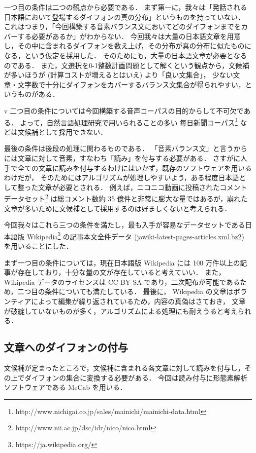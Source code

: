 \documentclass[final,10pt,twocolumn,3p,times,fleqn]{elsarticle}
\begin{document}
  一つ目の条件は二つの観点から必要である．
  まず第一に，我々は「発話される日本語において登場するダイフォンの真の分布」というものを持っていない．
  これはつまり，「今回構築する音素バランス文においてどのダイフォンまでをカバーする必要があるか」がわからない．
  今回我々は大量の日本語文章を用意し，その中に含まれるダイフォンを数え上げ，その分布が真の分布に似たものになる，という仮定を採用した．
  そのためにも，大量の日本語文章が必要となるのである．
  また，文選択を0-1整数計画問題として解くという観点から，文候補が多いほうが (計算コストが増えるとはいえ) より「良い文集合」，
  少ない文章・文字数で十分にダイフォンをカバーするバランス文集合が得られやすい，というものがある．

v  二つ目の条件については今回構築する音声コーパスの目的からして不可欠である．
  よって，自然言語処理研究で用いられることの多い
  毎日新聞コーパス\footnote{http://www.nichigai.co.jp/sales/mainichi/mainichi-data.html} などは文候補として採用できない．

  最後の条件は後段の処理に関わるものである．
  「音素バランス文」と言うからには文章に対して音素，すなわち「読み」を付与する必要がある．
  さすがに人手で全ての文章に読みを付与するわけにはいかず，既存のソフトウェアを用いるわけだが，
  そのためにはアルゴリズムが処理しやすいよう，ある程度日本語として整った文章が必要とされる．
  例えば，ニコニコ動画に投稿されたコメントデータセット\footnote{http://www.nii.ac.jp/dsc/idr/nico/nico.html}
  は総コメント数約 35 億件と非常に膨大な量ではあるが，崩れた文章が多いために文候補として採用するのは好ましくないと考えられる．

  今回我々はこれら三つの条件を満たし，最も入手が容易なデータセットである日本語版 Wikipedia\footnote{https://ja.wikipedia.org/}
  の記事本文全件データ (jawiki-latest-pages-articles.xml.bz2) を用いることにした．

  まず一つ目の条件については，現在日本語版 Wikipedia には 100 万件以上の記事が存在しており，十分な量の文が存在していると考えていい．
  また， Wikipedia データのライセンスは CC-BY-SA であり，二次配布が可能であるため，二つ目の条件についても満たしている．
  最後に， Wikipedia の文章はボランティアによって編集が繰り返されているため，内容の真偽はさておき，
  文章が破綻していないものが多く，アルゴリズムによる処理にも耐えうると考えられる．

  \subsection{文章へのダイフォンの付与}
  文候補が定まったところで，文候補に含まれる各文章に対して読みを付与し，その上でダイフォンの集合に変換する必要がある．
  今回は読み付与に形態素解析ソフトウェアである MeCab\cite{mecab} を用いる．
\end{document}
